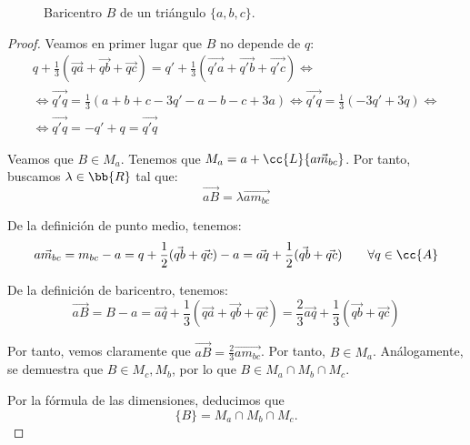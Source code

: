 \begin{teo}[Baricentro]
\begin{figure}[H]
        \caption{Baricentro $B$ de un triángulo $\{a,b,c\}$.}
    \end{figure}
\end{teo}
\begin{proof}
    Veamos en primer lugar que $B$ no depende de $q$:
    \begin{multline*}
        q + \frac{1}{3}\left(\vec{qa} + \vec{qb} + \vec{qc}\right) = q' + \frac{1}{3}\left(\vec{q'a} + \vec{q'b} + \vec{q'c}\right) 
        \Longleftrightarrow \\
        \Longleftrightarrow
        \vec{q'q} = \frac{1}{3}\left(a+b+c-3q'-a-b-c+3a\right)
        \Longleftrightarrow
        \vec{q'q} = \frac{1}{3}\left(-3q'+3q\right)
        \Longleftrightarrow\\ \Longleftrightarrow
        \vec{q'q} = -q'+q = \vec{q'q}
    \end{multline*}

    Veamos que $B\in M_a$. Tenemos que $M_a = a + \cc{L}\{\vec{am_{bc}}\}$. Por tanto, buscamos $\lambda\in \bb{R}$ tal que:
    \begin{equation*}
        \vec{aB} = \lambda \vec{am_{bc}}
    \end{equation*}

    De la definición de punto medio, tenemos:
    \begin{equation*}
        \vec{am_{bc}} = m_{bc} - a = q+\frac{1}{2}(\vec{qb} + \vec{qc}) -a = \vec{aq}+\frac{1}{2}(\vec{qb} + \vec{qc}) \qquad \forall q\in \cc{A}
    \end{equation*}

    De la definición de baricentro, tenemos:
    \begin{equation*}
        \vec{aB} = B-a = \vec{aq} + \frac{1}{3}\left(\vec{qa} + \vec{qb} + \vec{qc}\right)
        = \frac{2}{3}\vec{aq} + \frac{1}{3}(\vec{qb} + \vec{qc})
    \end{equation*}

    Por tanto, vemos claramente que $\vec{aB}=\frac{2}{3}\vec{am_{bc}}$. Por tanto, $B\in M_a$. Análogamente, se demuestra que $B\in M_c,M_b$, por lo que $B\in M_a\cap M_b\cap M_c$.

    Por la fórmula de las dimensiones, deducimos que $$\{B\}=M_a\cap M_b\cap M_c.$$
\end{proof}


